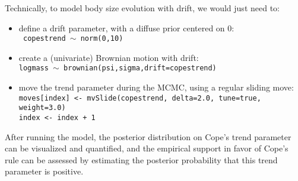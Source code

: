 \documentclass[usletter]{article}
\newcommand{\cmd}[1]{\texttt{#1}}
\begin{document}
Technically, to model body size evolution with drift, we would just need to:
\begin{itemize}
\item
define a drift parameter, with a diffuse prior centered on 0:
\\
\cmd{
copestrend $\sim$ norm(0,10)
}
\item
create a (univariate) Brownian motion with drift:
\\
\cmd{logmass $\sim$ brownian(psi,sigma,drift=copestrend)}
\item
move the trend parameter during the MCMC, using a regular sliding move:
\\
\cmd{moves[index] <- mvSlide(copestrend, delta=2.0, tune=true, weight=3.0)
\\
index <- index + 1}
\end{itemize}
After running the model, the posterior distribution on Cope's trend parameter can be visualized and quantified, and the empirical support in favor of Cope's rule can be assessed by estimating the posterior probability that this trend parameter is positive.





\end{document}
